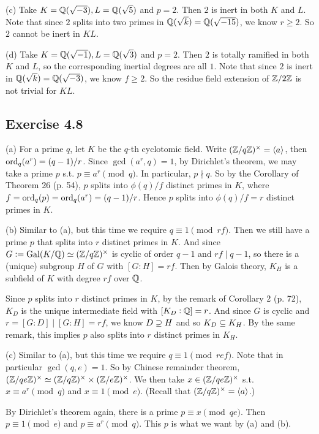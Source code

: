 \documentclass[../Marcus.tex]{subfiles}
\begin{document}
(c) Take $K=\mathbb{Q}(\sqrt{-3}),L=\mathbb{Q}(\sqrt{5})$ and $p=2$. Then $2$ is inert in both $K$ and $L$. Note that since $2$ splits into two primes in $\mathbb{Q}(\sqrt{k})=\mathbb{Q}(\sqrt{-15})$, we know $r\geq 2$. So $2$ cannot be inert in $KL$.

(d) Take $K=\mathbb{Q}(\sqrt{-1}),L=\mathbb{Q}(\sqrt{3})$ and $p=2$. Then $2$ is totally ramified in both $K$ and $L$, so the corresponding inertial degrees are all $1$. Note that since $2$ is inert in $\mathbb{Q}(\sqrt{k})=\mathbb{Q}(\sqrt{-3})$, we know $f\geq 2$. So the residue field extension of $\mathbb{Z}/2\mathbb{Z}$ is not trivial for $KL$.

\subsection*{Exercise 4.8}

(a) For a prime $q$, let $K$ be the $q$-th cyclotomic field. Write $(\mathbb{Z}/q\mathbb{Z})^\times=\langle a\rangle$, then $\operatorname{ord}_q(a^r) = (q-1)/r$. Since $\gcd(a^r,q)=1$, by Dirichlet's theorem, we may take a prime $p$ s.t. $p\equiv a^r \pmod{q}$. In particular, $p \nmid q$. So by the Corollary of Theorem 26 (p. 54), $p$ splits into $\phi(q)/f$ distinct primes in $K$, where $f = \operatorname{ord}_q(p) = \operatorname{ord}_q(a^r) = (q-1)/r$. Hence $p$ splits into $\phi(q)/f = r$ distinct primes in $K$.

(b) Similar to (a), but this time we require $q \equiv 1 \pmod{rf}$. Then we still have a prime $p$ that splits into $r$ distinct primes in $K$. And since $G := \operatorname{Gal}(K/\mathbb{Q}) \simeq (\mathbb{Z}/q\mathbb{Z})^\times$ is cyclic of order $q-1$ and $rf \mid q-1$, so there is a (unique) subgroup $H$ of $G$ with $[G:H] = rf$. Then by Galois theory, $K_H$ is a subfield of $K$ with degree $rf$ over $\mathbb{Q}$.

Since $p$ splits into $r$ distinct primes in $K$, by the remark of Corollary 2 (p. 72), $K_D$ is the unique intermediate field with $[K_D:\mathbb{Q}]=r$. And since $G$ is cyclic and $r = [G:D] \mid [G:H] = rf$, we know $D \supseteq H$ and so $K_D \subseteq K_H$. By the same remark, this implies $p$ also splits into $r$ distinct primes in $K_H$.

(c) Similar to (a), but this time we require $q \equiv 1 \pmod{ref}$. Note that in particular $\gcd(q,e)=1$. So by Chinese remainder theorem, $(\mathbb{Z}/qe\mathbb{Z})^\times \simeq (\mathbb{Z}/q\mathbb{Z})^\times \times (\mathbb{Z}/e\mathbb{Z})^\times$. We then take $x \in (\mathbb{Z}/qe\mathbb{Z})^\times$ s.t. $x\equiv a^r\pmod{q}$ and $x\equiv 1\pmod{e}$. (Recall that $(\mathbb{Z}/q\mathbb{Z})^\times=\langle a\rangle$.)

By Dirichlet's theorem again, there is a prime $p \equiv x \pmod{qe}$. Then $p\equiv 1\pmod{e}$ and $p\equiv a^r\pmod{q}$. This $p$ is what we want by (a) and (b).
\end{document}
